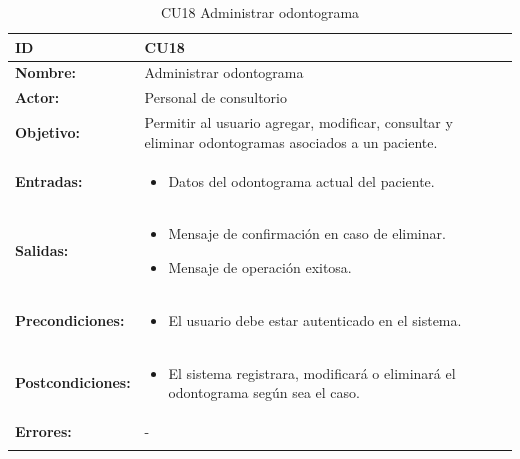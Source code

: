 \begin{longtable}[H]{|p{}|p{12cm}|}
\hline\textbf{ID}         
& \textbf{CU18}            \\ \hline
\textbf{Nombre:}          
& Administrar odontograma   \\ \hline
\textbf{Actor:}          
& Personal de consultorio   \\ \hline
\textbf{Objetivo:}       
& Permitir al usuario agregar, modificar, consultar y eliminar odontogramas asociados a un paciente.\\ \hline
\textbf{Entradas:}  & 
\begin{itemize}[nosep]
\item Datos del odontograma actual del paciente.
\end{itemize}
\\ \hline
\textbf{Salidas:}  & 
\begin{itemize}[nosep]
\item Mensaje de confirmación en caso de eliminar.
\item Mensaje de operación exitosa.
\end{itemize}
\\ \hline
\textbf{Precondiciones:}  &             
\begin{itemize}[nosep]
\item El usuario debe estar autenticado en el sistema.
\end{itemize}
\\ \hline
\textbf{Postcondiciones:} & 
\begin{itemize}[nosep]
\item El sistema registrara, modificará o eliminará el odontograma según sea el caso.
\end{itemize}
\\ \hline
\textbf{Errores:} &  -
\\ \hline
\caption{CU18 Administrar odontograma}
\label{table:1}
\end{longtable}

